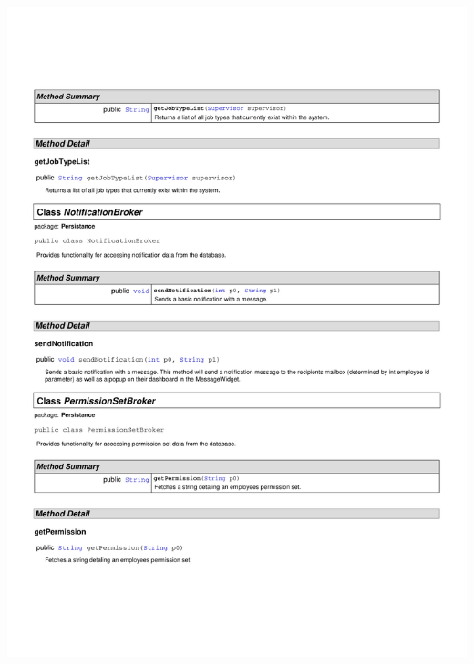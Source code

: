 \documentclass[letterpaper,12pt]{report}
\begin{document}
\includegraphics[scale=0.9,trim=20mm 30mm 25mm 25mm]{externals/PersistanceDataDictionary3.pdf}
\newpage
\end{document}
